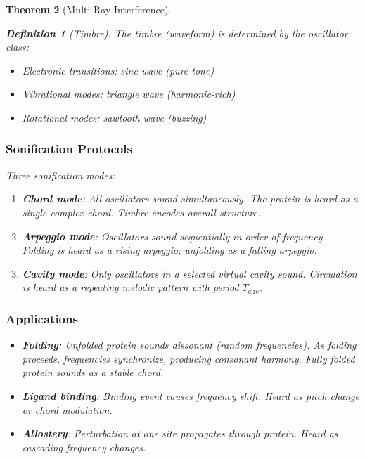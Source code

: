 \documentclass[11pt,a4paper]{article}
\newtheorem{theorem}{Theorem}[section]
\newtheorem{definition}[theorem]{Definition}
\begin{document}
\begin{theorem}[Multi-Ray Interference]
\begin{definition}[Timbre]
The timbre (waveform) is determined by the oscillator class:
\begin{itemize}
\item Electronic transitions: sine wave (pure tone)
\item Vibrational modes: triangle wave (harmonic-rich)
\item Rotational modes: sawtooth wave (buzzing)
\end{itemize}
\end{definition}

\subsubsection{Sonification Protocols}

Three sonification modes:

\begin{enumerate}
\item \textbf{Chord mode}: All oscillators sound simultaneously. The protein is heard as a single complex chord. Timbre encodes overall structure.

\item \textbf{Arpeggio mode}: Oscillators sound sequentially in order of frequency. Folding is heard as a rising arpeggio; unfolding as a falling arpeggio.

\item \textbf{Cavity mode}: Only oscillators in a selected virtual cavity sound. Circulation is heard as a repeating melodic pattern with period $T_{\text{circ}}$.
\end{enumerate}

\subsubsection{Applications}

\begin{itemize}
\item \textbf{Folding}: Unfolded protein sounds dissonant (random frequencies). As folding proceeds, frequencies synchronize, producing consonant harmony. Fully folded protein sounds as a stable chord.

\item \textbf{Ligand binding}: Binding event causes frequency shift. Heard as pitch change or chord modulation.

\item \textbf{Allostery}: Perturbation at one site propagates through protein. Heard as cascading frequency changes.


\end{itemize}
\end{theorem}
\end{document}

